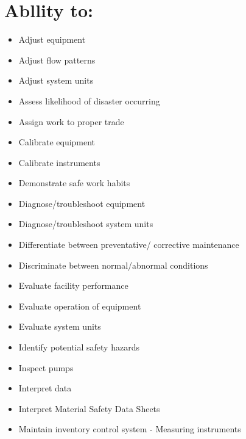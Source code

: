 \documentclass[10pt]{article}
\begin{document}
\section{Abllity to:}
\begin{itemize}
  \item Adjust equipment

  \item Adjust flow patterns

  \item Adjust system units

  \item Assess likelihood of disaster occurring

  \item Assign work to proper trade

  \item Calibrate equipment

  \item Calibrate instruments

  \item Demonstrate safe work habits

  \item Diagnose/troubleshoot equipment

  \item Diagnose/troubleshoot system units

  \item Differentiate between preventative/ corrective maintenance

  \item Discriminate between normal/abnormal conditions

  \item Evaluate facility performance

  \item Evaluate operation of equipment

  \item Evaluate system units

  \item Identify potential safety hazards

  \item Inspect pumps

  \item Interpret data

  \item Interpret Material Safety Data Sheets

  \item Maintain inventory control system - Measuring instruments


\end{itemize}
\end{document}
